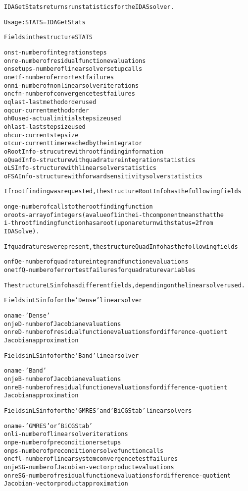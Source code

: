 \begin{alltt}
IDAGetStats returns run statistics for the IDAS solver.

   Usage: STATS = IDAGetStats

Fields in the structure STATS

o nst      - number of integration steps
o nre      - number of residual function evaluations
o nsetups  - number of linear solver setup calls
o netf     - number of error test failures
o nni      - number of nonlinear solver iterations
o ncfn     - number of convergence test failures
o qlast    - last method order used
o qcur     - current method order
o h0used   - actual initial step size used
o hlast    - last step size used
o hcur     - current step size
o tcur     - current time reached by the integrator
o RootInfo - strucutre with rootfinding information
o QuadInfo - structure with quadrature integration statistics
o LSInfo   - structure with linear solver statistics
o FSAInfo  - structure with forward sensitivity solver statistics

If rootfinding was requested, the structure RootInfo has the following fields

o nge   - number of calls to the rootfinding function
o roots - array of integers (a value of 1 in the i-th component means that the
          i-th rootfinding function has a root (upon a return with status=2 from
          IDASolve).

If quadratures were present, the structure QuadInfo has the following fields

o nfQe  - number of quadrature integrand function evaluations
o netfQ - number of error test failures for quadrature variables

The structure LSinfo has different fields, depending on the linear solver used.

  Fields in LSinfo for the 'Dense' linear solver

o name - 'Dense'
o njeD - number of Jacobian evaluations
o nreD - number of residual function evaluations for difference-quotient
         Jacobian approximation

  Fields in LSinfo for the 'Band' linear solver

o name - 'Band'
o njeB - number of Jacobian evaluations
o nreB - number of residual function evaluations for difference-quotient
         Jacobian approximation

  Fields in LSinfo for the 'GMRES' and 'BiCGStab' linear solvers

o name  - 'GMRES' or 'BiCGStab'
o nli   - number of linear solver iterations
o npe   - number of preconditioner setups
o nps   - number of preconditioner solve function calls
o ncfl  - number of linear system convergence test failures
o njeSG - number of Jacobian-vector product evaluations
o nreSG - number of residual function evaluations for difference-quotient
          Jacobian-vector product approximation


\end{alltt}
